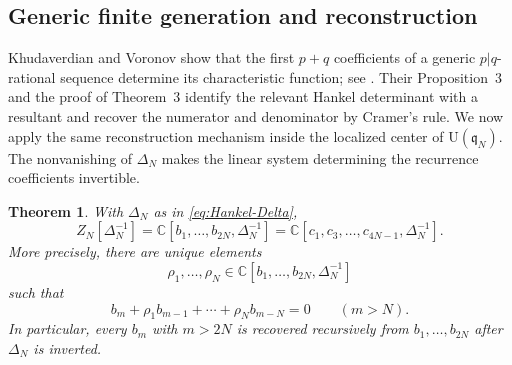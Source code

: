 \documentclass[11pt]{amsart}
\numberwithin{equation}{section}
\newtheorem{theorem}{Theorem}[section]
\theoremstyle{definition}
\theoremstyle{remark}
\newcommand{\C}{\mathbb C}
\newcommand{\q}{\mathfrak q}
\newcommand{\U}{\mathrm U}
\begin{document}
\subsection{Generic finite generation and reconstruction}

Khudaverdian and Voronov show that the first \(p+q\) coefficients of a
generic \(p|q\)-rational sequence determine its characteristic
function; see \cite[Eq.~(4.1)]{KV2005}.  Their Proposition~3 and the
proof of Theorem~3 identify the relevant Hankel determinant with a
resultant and recover the numerator and denominator by Cramer's rule.
We now apply the same reconstruction mechanism inside the localized
center of \(\U(\q_N)\).  The nonvanishing of \(\Delta_N\) makes the
linear system determining the recurrence coefficients invertible.

\begin{theorem}
\label{thm:generic-finite-generation}
With \(\Delta_N\) as in \eqref{eq:Hankel-Delta},
\begin{equation}
 \boxed{
 Z_N[\Delta_N^{-1}]
 =\C[b_1,\ldots,b_{2N},\Delta_N^{-1}]
 =\C[c_1,c_3,\ldots,c_{4N-1},\Delta_N^{-1}].}
 \label{eq:generic-finite-generation}
\end{equation}
More precisely, there are unique elements
\[
 \rho_1,\ldots,\rho_N
 \in\C[b_1,\ldots,b_{2N},\Delta_N^{-1}]
\]
such that
\begin{equation}
 b_m+\rho_1b_{m-1}+\cdots+\rho_Nb_{m-N}=0
 \qquad(m>N).
 \label{eq:central-reconstruction-recurrence}
\end{equation}
In particular, every \(b_m\) with \(m>2N\) is recovered recursively
from \(b_1,\ldots,b_{2N}\) after \(\Delta_N\) is inverted.
\end{theorem}
\end{document}
